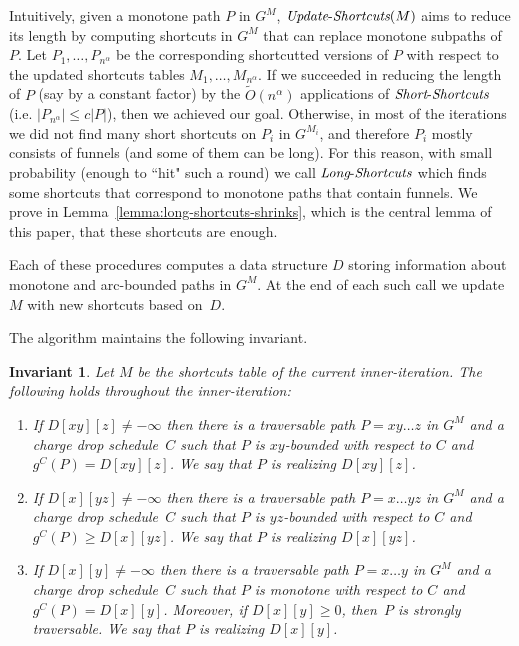 \documentclass[11pt]{article}
\newtheorem{invariant}{Invariant}
\newcommand{\LS}{\mbox{{\it Long}-{\it Shortcuts}}}
\newcommand{\Simple}{\mbox{{\it Short}-{\it Shortcuts}}}
\newcommand{\UpdateS}{\mbox{{\it Update}-{\it Shortcuts}}}
\begin{document}
Intuitively, given a monotone path $P$ in $G^M$, $\UpdateS(M)$ aims to reduce its length by computing shortcuts in $G^M$ that can replace monotone subpaths of $P$. Let $P_1,\ldots, P_{n^\alpha}$ be the corresponding shortcutted versions of $P$ with respect to the updated shortcuts tables $M_1,\ldots, M_{n^\alpha}$.  If we succeeded in reducing the length of $P$ (say by a constant factor) by the $\tilde{O}(n^\alpha)$ applications of $\Simple$ (i.e. $|P_{n^\alpha}| \le c|P|$), then we achieved our goal. Otherwise, in most of the iterations we did not find many short shortcuts on $P_i$ in $G^{M_i}$, and therefore $P_i$ mostly consists of funnels (and some of them can be long). For this reason, with small probability (enough to ``hit" such a round) we call $\LS$ which finds some shortcuts that correspond to monotone paths that contain funnels. We prove in Lemma~\ref{lemma:long-shortcuts-shrinks}, which is the central lemma of this paper, that these shortcuts are enough.


Each of these procedures computes a data structure
$D$   storing information about monotone and arc-bounded paths in  $G^M$.
At the end of each such call we update $M$ with new shortcuts based on~$D$.
 
The algorithm maintains the following invariant.

\begin{invariant}\label{invariant}
Let $M$ be the shortcuts table of the current inner-iteration. The following holds throughout the inner-iteration:

\begin{enumerate}[label=(\Alph*)]
    \item \label{1a} If $D[xy][z]\neq -\infty$ then there is a traversable path $P = xy \ldots z$ in $G^M$ and a charge drop schedule~$C$ such that $P$ is $xy$-bounded with respect to $C$ and $g^C(P) = D[xy][z]$.
    We say that $P$ is realizing $D[xy][z]$.
    \item \label{1b} If $D[x][yz]\neq -\infty$ then there is a traversable path $P = x \ldots yz$ in $G^M$ and a charge drop schedule~$C$ such that $P$ is $yz$-bounded with respect to $C$ and $g^C(P) \ge D[x][yz]$.
    We say that $P$ is realizing $D[x][yz]$.
    \item \label{1c} If $D[x][y]\neq -\infty$ then there is a traversable path $P = x \ldots y$ in $G^M$ and a charge drop schedule~$C$ such that $P$ is monotone with respect to $C$ and $g^C(P) = D[x][y]$. Moreover, if $D[x][y]\ge 0$, then~$P$ is strongly traversable. We say that $P$ is realizing $D[x][y]$.
\end{enumerate}
    
\end{invariant}
\end{document}
